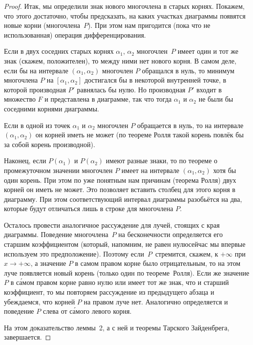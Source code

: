 \begin{proof}
Итак, мы определили знак нового многочлена в старых корнях.
Покажем, что этого достаточно, чтобы предсказать, на каких
участках диаграммы появятся новые корни (многочлена~$P$). При
этом нам пригодится (пока что не использованная) операция
дифференцирования.

Если в двух соседних старых корнях $\alpha_1$, $\alpha_2$
многочлен~$P$ имеет один и тот же знак (скажем,
положителен), то между ними нет нового корня. В самом деле, если
бы на интервале $(\alpha_1,\alpha_2)$ многочлен $P$ обращался
в нуль, то минимум многочлена $P$ на $[\alpha_1,\alpha_2]$
достигался бы в некоторой внутренней точке, в которой
производная $P'$ равнялась бы нулю. Но производная $P'$ входит в
множество $F$ и представлена в диаграмме, так что тогда
$\alpha_1$ и $\alpha_2$ не были бы соседними корнями диаграммы.

Если в одной из точек $\alpha_1$ и $\alpha_2$ многочлен $P$
обращается в нуль, то на интервале $(\alpha_1,\alpha_2)$ он
корней иметь не может (по теореме Ролля%
%
такой корень повлёк бы
за собой корень производной).

Наконец, если $P(\alpha_1)$ и $P(\alpha_2)$ имеют разные знаки,
то по теореме о промежуточном значении многочлен $P$ имеет на
интервале $(\alpha_1,\alpha_2)$ хотя бы один корень. При этом по
уже понятным нам причинам (теорема Ролля) двух корней он иметь
не может. Это позволяет вставить столбец для этого корня в
диаграмму. При этом соответствующий интервал диаграммы
разобьётся на два, которые будут отличаться лишь в строке для
многочлена $P$.

Осталось провести аналогичное рассуждение для лучей, стоящих с
края диаграммы. Поведение многочлена~$P$ на бесконечности
определяется его старшим коэффициентом (который, напомним, не
равен нулю\т сейчас мы впервые используем это предположение).
Поэтому если~$P$~стремится, скажем, к $+\infty$ при
$x\to+\infty$, а значение $P$ в самом правом корне было
отрицательным, то на этом луче появляется новый корень (только
один по теореме~Ролля). Если же значение $P$ в с\'амом правом
корне равно нулю или имеет тот же знак, что и старший
коэффициент, то мы повторяем рассуждение из предыдущего абзаца и
убеждаемся, что корней $P$ на правом луче нет. Аналогично
определяется и поведение $P$ слева от с\'амого левого корня.

На этом доказательство леммы~2, а с ней и теоремы Тарского\ч
Зайденбрега, завершается.
\end{proof}

